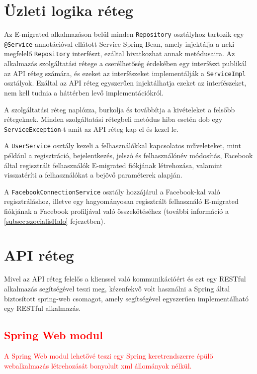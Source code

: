 \section{Üzleti logika réteg}
\label{subsec:szolgaltatas}
Az E-migrated alkalmazáson belül minden \texttt{Repository} osztályhoz tartozik egy \texttt{@Service} annotációval ellátott Service Spring Bean, amely injektálja a neki megfelelő \texttt{Repository} interfészt, ezáltal hivatkozhat annak metódusaira. Az alkalmazás szolgáltatási rétege a cserélhetőség érdekében egy interfészt publikál az API réteg számára, és ezeket az interfészeket implementálják a \texttt{ServiceImpl} osztályok. Ezáltal az API réteg egyszerűen injektálhatja ezeket az interfészeket, nem kell tudnia a háttérben levő implementációkról. 

A szolgáltatási réteg naplózza, burkolja és továbbítja a kivételeket a felsőbb rétegeknek. Minden szolgáltatási rétegbeli metódus hiba esetén dob egy \texttt{ServiceException}-t amit az API réteg kap el és kezel le.

A \texttt{UserService} osztály kezeli a felhasználókkal kapcsolatos műveleteket, mint például a regisztráció, bejelentkezés, jelszó és felhasználónév módosítás, Facebook által regisztrált felhasználók E-migrated fiókjának létrehozása, valamint visszatéríti a felhasználókat a bejövő paraméterek alapján. 

A \texttt{FacebookConnectionService} osztály hozzájárul a Facebook-kal való regisztráláshoz, illetve egy hagyományosan regisztrált felhasználó E-migrated fiókjának a Facebook profiljával való összekötéséhez (további információ a  \ref{subsec:szocialisHalo} fejezetben).
\section{API réteg}
\label{subsec:API}

Mivel az API réteg felelős a klienssel való kommunikációért és ezt egy RESTful alkalmazás segítségével teszi meg, kézenfekvő volt használni a Spring által biztosított spring-web csomagot, amely segítségével egyszerűen implementálható egy RESTful alkalmazás. 

\textcolor{red}{\subsection{Spring Web modul}\label{subsubsec:SpringWeb}
A Spring Web modul lehetővé teszi egy Spring keretrendszerre épülő webalkalmazás létrehozását bonyolult xml állományok nélkül. }

